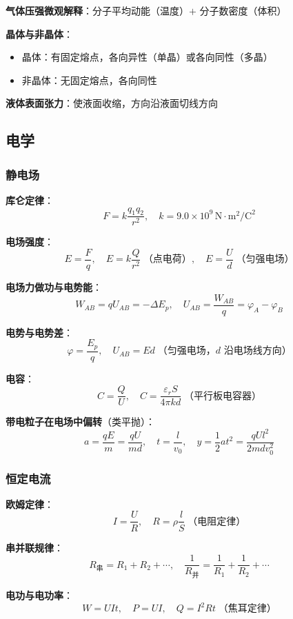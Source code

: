 \textbf{气体压强微观解释}：分子平均动能（温度）$+$ 分子数密度（体积）

\textbf{晶体与非晶体}：
\begin{itemize}
  \item 晶体：有固定熔点，各向异性（单晶）或各向同性（多晶）
  \item 非晶体：无固定熔点，各向同性
\end{itemize}

\textbf{液体表面张力}：使液面收缩，方向沿液面切线方向

\subsection{电学}

\subsubsection{静电场}

\textbf{库仑定律}：
\[
F = k\frac{q_1q_2}{r^2},\quad
k = 9.0\times10^9\,\text{N}\cdot\text{m}^2/\text{C}^2
\]

\textbf{电场强度}：
\[
E = \frac{F}{q},\quad
E = k\frac{Q}{r^2}\;\text{（点电荷）},\quad
E = \frac{U}{d}\;\text{（匀强电场）}
\]

\textbf{电场力做功与电势能}：
\[
W_{AB} = qU_{AB} = -\Delta E_p,\quad
U_{AB} = \frac{W_{AB}}{q} = \varphi_A - \varphi_B
\]

\textbf{电势与电势差}：
\[
\varphi = \frac{E_p}{q},\quad
U_{AB} = Ed\;\text{（匀强电场，$d$ 沿电场线方向）}
\]

\textbf{电容}：
\[
C = \frac{Q}{U},\quad
C = \frac{\varepsilon_r S}{4\pi kd}\;\text{（平行板电容器）}
\]

\textbf{带电粒子在电场中偏转}（类平抛）：
\[
a = \frac{qE}{m} = \frac{qU}{md},\quad
t = \frac{l}{v_0},\quad
y = \frac12 at^2 = \frac{qUl^2}{2mdv_0^2}
\]

\subsubsection{恒定电流}

\textbf{欧姆定律}：
\[
I = \frac{U}{R},\quad
R = \rho\frac{l}{S}\;\text{（电阻定律）}
\]

\textbf{串并联规律}：
\[
R_{\text{串}} = R_1 + R_2 + \cdots,\quad
\frac{1}{R_{\text{并}}} = \frac{1}{R_1} + \frac{1}{R_2} + \cdots
\]

\textbf{电功与电功率}：
\[
W = UIt,\quad
P = UI,\quad
Q = I^2Rt\;\text{（焦耳定律）}
\]


